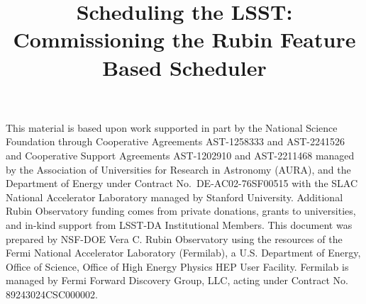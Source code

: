 \documentclass[]{spie}
\begin{document}

\title{Scheduling the LSST: Commissioning the Rubin Feature Based Scheduler}


\maketitle





\acknowledgments

This material is based upon work supported in part by the National Science Foundation through Cooperative Agreements AST-1258333 and AST-2241526 and Cooperative Support Agreements AST-1202910 and AST-2211468 managed by the Association of Universities for Research in Astronomy (AURA), and the Department of Energy under Contract No.\ DE-AC02-76SF00515 with the SLAC National Accelerator Laboratory managed by Stanford University.
Additional Rubin Observatory funding comes from private donations, grants to universities, and in-kind support from LSST-DA Institutional Members.
This document was prepared by NSF-DOE Vera C. Rubin Observatory using the resources of the Fermi National Accelerator Laboratory (Fermilab), a U.S. Department of Energy, Office of Science, Office of High Energy Physics HEP User Facility. Fermilab is managed by Fermi Forward Discovery Group, LLC, acting under Contract No. 89243024CSC000002.





\end{document}
